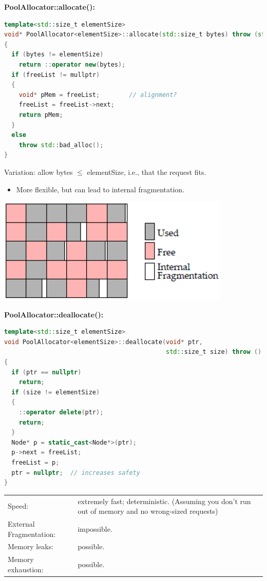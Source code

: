 \textbf{PoolAllocator::allocate():}
\begin{lstlisting}[language=C++]
template<std::size_t elementSize>
void* PoolAllocator<elementSize>::allocate(std::size_t bytes) throw (std::bad_alloc)
{
  if (bytes != elementSize)
    return ::operator new(bytes);
  if (freeList != mullptr)
  {
    void* pMem = freeList;        // alignment?
    freeList = freeList->next;
    return pMem;
  }
  else
    throw std::bad_alloc();
}
\end{lstlisting}
\begin{minipage}{0.6\linewidth}
Variation: allow bytes $\leq$ elementSize, i.e., that the request fits.
\begin{itemize}
  \item More flexible, but can lead to internal fragmentation.
\end{itemize}
\end{minipage}
\begin{minipage}{0.4\linewidth}
  \includegraphics[width=\linewidth]{images/AdvancedCPP/internalFragmentation.png}
\end{minipage}

\textbf{PoolAllocator::deallocate():}
\begin{lstlisting}[language=C++]
template<std::size_t elementSize>
void PoolAllocator<elementSize>::deallocate(void* ptr,
                                            std::size_t size) throw ()
{
  if (ptr == nullptr)
    return;
  if (size != elementSize)
  {
    ::operator delete(ptr);
    return;
  }
  Node* p = static_cast<Node*>(ptr);
  p->next = freeList;
  freeList = p;
  ptr = nullptr;  // increases safety
}
\end{lstlisting}

\begin{tabular}{|l|p{7cm}|}
  \hline
  Speed: & extremely fast; deterministic. (Assuming you don't run out of memory and no wrong-sized requests)\\
  External Fragmentation: & impossible.\\
  Memory leaks: & possible.\\
  Memory exhaustion: & possible.\\
  \hline
\end{tabular}

